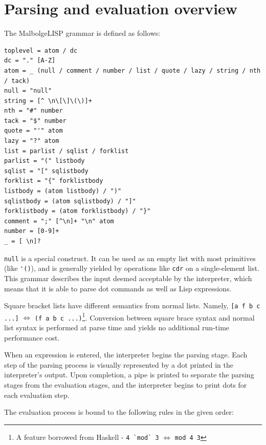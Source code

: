 \section{Parsing and evaluation overview}

\par The MalbolgeLISP grammar is defined as follows:

\begin{verbatim}
toplevel = atom / dc
dc = "." [A-Z]
atom = _ (null / comment / number / list / quote / lazy / string / nth / tack)
null = "null"
string = [^ \n\[\]\(\)]+
nth = "#" number
tack = "$" number
quote = "'" atom
lazy = "?" atom
list = parlist / sqlist / forklist
parlist = "(" listbody
sqlist = "[" sqlistbody
forklist = "{" forklistbody
listbody = (atom listbody) / ")"
sqlistbody = (atom sqlistbody) / "]"
forklistbody = (atom forklistbody) / "}"
comment = ";" [^\n]+ "\n" atom
number = [0-9]+
_ = [ \n]?
\end{verbatim}

\par \verb|null| is a special construct. It can be used as an empty list with most primitives (like \verb|'()|), and is generally yielded by operations like \verb|cdr| on a single-element list. This grammar describes the input deemed acceptable by the interpreter, which means that it is able to parse dot commands as well as Lisp expressions.

\par Square bracket lists have different semantics from normal lists. Namely, \verb|[a f b c ...]| $\Leftrightarrow$ \verb|(f a b c ...)|\footnote{A feature borrowed from Haskell - \verb|4 `mod` 3| $\Leftrightarrow$ \verb|mod 4 3|}. Conversion between square brace syntax and normal list syntax is performed at parse time and yields no additional run-time performance cost.

\par When an expression is entered, the interpreter begins the parsing stage. Each step of the parsing process is visually represented by a dot printed in the interpreter's output. Upon completion, a pipe is printed to separate the parsing stages from the evaluation stages, and the interpreter begins to print dots for each evaluation step.

\par The evaluation process is bound to the following rules in the given order:

